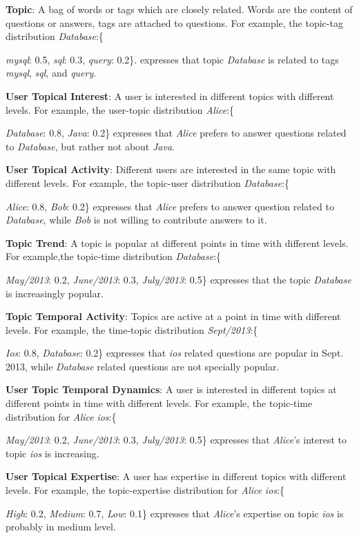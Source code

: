\textbf{Topic}: A bag of words or tags which are closely related. Words are the content of questions or answers, tags are attached to questions. For example, the topic-tag distribution \textit{Database}:\{{\textit{mysql}: 0.5, \textit{sql}: 0.3, \textit{query}: 0.2\}. expresses that topic \textit{Database} is related to tags \textit{mysql}, \textit{sql}, and \textit{query}. 


\textbf{User Topical Interest}: A user is interested in different topics with different levels. For example, the user-topic distribution \textit{Alice}:\{{\textit{Database}: 0.8, \textit{Java}: 0.2\} expresses that \textit{Alice} prefers to answer questions related to \textit{Database}, but rather not about \textit{Java}. 

\textbf{User Topical Activity}:  Different users are interested in the same topic with different levels. For example, the topic-user distribution \textit{Database}:\{{\textit{Alice}: 0.8, \textit{Bob}: 0.2\} expresses that \textit{Alice} prefers to answer question related to \textit{Database}, while \textit{Bob} is not willing to contribute answers to it.

\textbf{Topic Trend}: A topic is popular at different points in time with different levels. For example,the topic-time distribution \textit{Database}:\{{\textit{May/2013}: 0.2, \textit{June/2013}: 0.3, \textit{July/2013}: 0.5\} expresses that the topic \textit{Database} is increasingly popular.%

\textbf{Topic Temporal Activity}: Topics are active at a point in time with different levels. For example, the time-topic distribution \textit{Sept/2013}:\{{\textit{Ios}: 0.8, \textit{Database}: 0.2\} expresses that \textit{ios} related questions are popular in Sept. 2013, while \textit{Database} related questions are not specially popular.

\textbf{User Topic Temporal Dynamics}: A user is interested in different topics at different points in time with different levels. For example, the topic-time distribution for \textit{Alice} \textit{ios}:\{{\textit{May/2013}: 0.2, \textit{June/2013}: 0.3, \textit{July/2013}: 0.5\} expresses that \textit{Alice}'s interest to topic \textit{ios} is increasing.


\textbf{User Topical Expertise}: A user has expertise in different topics with different levels. For example, the topic-expertise distribution for \textit{Alice} \textit{ios}:\{{\textit{High}: 0.2, \textit{Medium}: 0.7, \textit{Low}: 0.1\} expresses that \textit{Alice}'s expertise on topic \textit{ios} is probably in medium level.



}}}}}}}
